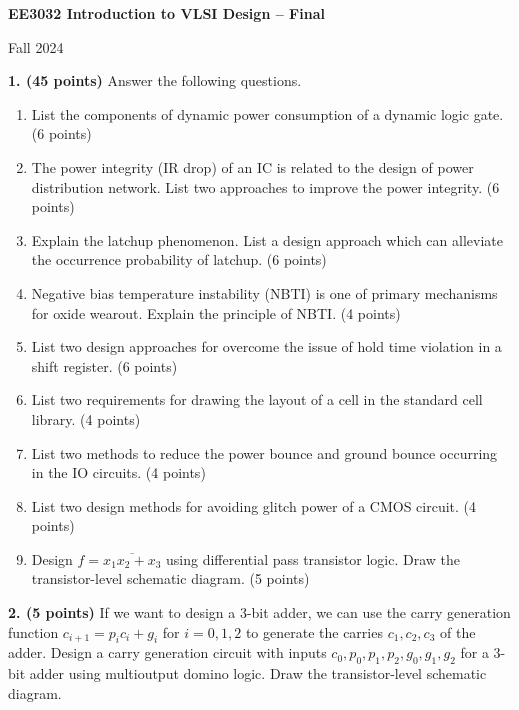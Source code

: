 \documentclass[10pt]{article}
\begin{document}
\begin{center}{\large\bfseries EE3032 Introduction to VLSI Design -- Final}\par Fall 2024\end{center}
\textbf{1. (45 points)} Answer the following questions.
\begin{enumerate}[label=(\alph*),leftmargin=7mm,itemsep=4pt]
\item List the components of dynamic power consumption of a dynamic logic gate. (6 points)
\item The power integrity (IR drop) of an IC is related to the design of power distribution network. List two approaches to improve the power integrity. (6 points)
\item Explain the latchup phenomenon. List a design approach which can alleviate the occurrence probability of latchup. (6 points)
\item Negative bias temperature instability (NBTI) is one of primary mechanisms for oxide wearout. Explain the principle of NBTI. (4 points)
\item List two design approaches for overcome the issue of hold time violation in a shift register. (6 points)
\item List two requirements for drawing the layout of a cell in the standard cell library. (4 points)
\item List two methods to reduce the power bounce and ground bounce occurring in the IO circuits. (4 points)
\item List two design methods for avoiding glitch power of a CMOS circuit. (4 points)
\item Design $f=\overline{x_1x_2+x_3}$ using differential pass transistor logic. Draw the transistor-level schematic diagram. (5 points)
\end{enumerate}
\textbf{2. (5 points)} If we want to design a 3-bit adder, we can use the carry generation function $c_{i+1}=p_i c_i+g_i$ for $i=0,1,2$ to generate the carries $c_1,c_2,c_3$ of the adder. Design a carry generation circuit with inputs $c_0,p_0,p_1,p_2,g_0,g_1,g_2$ for a 3-bit adder using multioutput domino logic. Draw the transistor-level schematic diagram.
\end{document}
